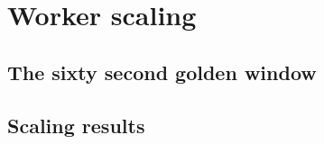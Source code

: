 \section{Worker scaling}

\subsection{The sixty second golden window}

\subsection{Scaling results}\label{sec:worker-scaling-results}